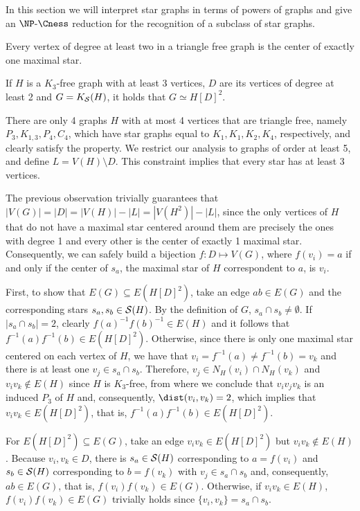 


In this section we will interpret star graphs in terms of powers of graphs and give an $\NPcness$ reduction for the recognition of a subclass of star graphs.

\begin{observation}
    Every vertex of degree at least two in a triangle free graph is the center of exactly one maximal star.
\end{observation}

\begin{theorem}
    \label{thm:tri_free_star}
    If $H$ is a $K_3$-free graph with at least 3 vertices, $D$ are its vertices of degree at least 2 and $G = K_{\mathcal{S}}(H)$, it holds that $G \simeq H[D]^2$.
\end{theorem}

\begin{tproof}
    There are only 4 graphs $H$ with at most 4 vertices that are triangle free, namely $P_3, K_{1,3}, P_4, C_4$, which have star graphs equal to $K_1, K_1, K_2, K_4$, respectively, and clearly satisfy the property.
    We restrict our analysis to graphs of order at least 5, and define $L = V(H) \setminus D$.
    This constraint implies that every star has at least 3 vertices.
    
    The previous observation trivially guarantees that $|V(G)| = |D| = |V(H)| - |L| = |V(H^2)| - |L|$, since the only vertices of $H$ that do not have a maximal star centered around them are precisely the ones with degree 1 and every other is the center of exactly 1 maximal star.
    Consequently, we can safely build a bijection $f : D \mapsto V(G)$, where $f(v_i) = a$ if and only if the center of $s_a$, the maximal star of $H$ correspondent to $a$, is $v_i$.
    
    First, to show that $E(G) \subseteq E(H[D]^2)$, take an edge $ab \in E(G)$ and the corresponding stars $s_a, s_b \in \mathcal{S}(H)$.
    By the definition of $G$, $s_a \cap s_b \neq \emptyset$. If $|s_a \cap s_b| = 2$, clearly $f(a)^{-1}f(b)^{-1} \in E(H)$ and it follows that $f^{-1}(a)f^{-1}(b) \in E(H[D]^2)$.
    Otherwise, since there is only one maximal star centered on each vertex of $H$, we have that $v_i = f^{-1}(a) \neq f^{-1}(b) = v_k$ and there is at least one $v_j \in s_a \cap s_b$.
    Therefore, $v_j \in N_H(v_i) \cap N_H(v_k)$ and $v_iv_k \notin E(H)$ since $H$ is $K_3$-free, from where we conclude that $v_iv_jv_k$ is an induced $P_3$ of $H$ and, consequently, $\dist(v_i, v_k) = 2$, which implies that $v_iv_k \in E(H[D]^2)$, that is, $f^{-1}(a)f^{-1}(b) \in E(H[D]^2)$.
    
    For $E(H[D]^2) \subseteq E(G)$, take an edge $v_iv_k \in E(H[D]^2)$ but $v_iv_k \notin E(H)$.
    Because $v_i,v_k \in D$, there is $s_a \in \mathcal{S}(H)$ corresponding to $a = f(v_i)$ and $s_b \in \mathcal{S}(H)$ corresponding to $b = f(v_k)$ with $v_j \in s_a \cap s_b$ and, consequently, $ab \in E(G)$, that is, $f(v_i)f(v_k) \in E(G)$. Otherwise, if $v_iv_k \in E(H)$, $f(v_i)f(v_k) \in E(G)$ trivially holds since $\{v_i,v_k\} = s_a \cap s_b$.
\end{tproof}

